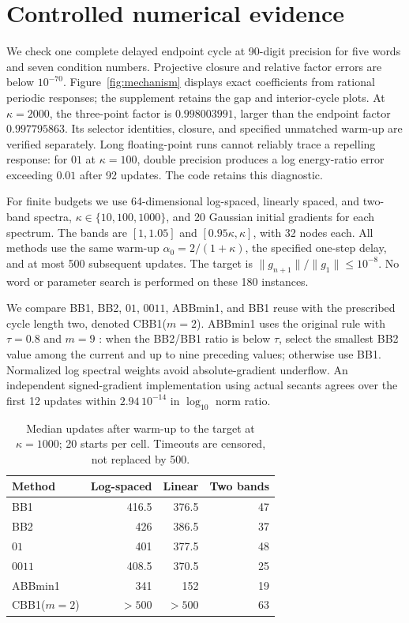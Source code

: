 \documentclass[letterpaper,twoside]{article}
\begin{document}
\section{Controlled numerical evidence}\label{sec:experiments}

We check one complete delayed endpoint cycle at 90-digit precision for five words and seven condition numbers. Projective closure and relative factor errors are below $10^{-70}$. Figure~\ref{fig:mechanism} displays exact coefficients from rational periodic responses; the supplement retains the gap and interior-cycle plots. At $\kappa=2000$, the three-point factor is $0.998003991$, larger than the endpoint factor $0.997795863$. Its selector identities, closure, and specified unmatched warm-up are verified separately. Long floating-point runs cannot reliably trace a repelling response: for $01$ at $\kappa=100$, double precision produces a log energy-ratio error exceeding $0.01$ after 92 updates. The code retains this diagnostic.

For finite budgets we use 64-dimensional log-spaced, linearly spaced, and two-band spectra, $\kappa\in\{10,100,1000\}$, and 20 Gaussian initial gradients for each spectrum. The bands are $[1,1.05]$ and $[0.95\kappa,\kappa]$, with 32 nodes each. All methods use the same warm-up $\alpha_0=2/(1+\kappa)$, the specified one-step delay, and at most 500 subsequent updates. The target is $\|g_{n+1}\|/\|g_1\|\le10^{-8}$. No word or parameter search is performed on these 180 instances.

We compare BB1, BB2, $01$, $0011$, ABBmin1, and BB1 reuse with the prescribed cycle length two, denoted CBB1($m=2$). ABBmin1 uses the original rule with $\tau=0.8$ and $m=9$ \cite[eq.~(14)]{FrassoldatiZanniZanghirati2008}: when the BB2/BB1 ratio is below $\tau$, select the smallest BB2 value among the current and up to nine preceding values; otherwise use BB1. Normalized log spectral weights avoid absolute-gradient underflow. An independent signed-gradient implementation using actual secants agrees over the first 12 updates within $2.94\,10^{-14}$ in $\log_{10}$ norm ratio.

\begin{table}[t]
\centering
\caption{Median updates after warm-up to the target at $\kappa=1000$; 20 starts per cell. Timeouts are censored, not replaced by 500.}
\label{tab:budget}
\begin{tabular}{lrrr}
\toprule
Method & Log-spaced & Linear & Two bands\\
\midrule
BB1 &416.5&376.5&47\\
BB2 &426&386.5&37\\
$01$ &401&377.5&48\\
$0011$ &408.5&370.5&25\\
ABBmin1 &341&152&19\\
CBB1($m=2$) &$>500$&$>500$&63\\
\bottomrule
\end{tabular}
\end{table}
\end{document}
